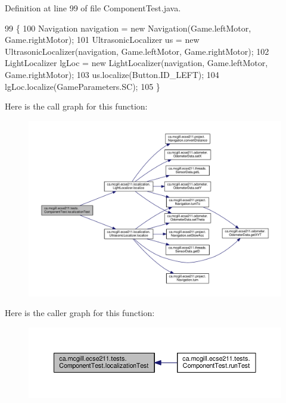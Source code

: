 Definition at line 99 of file Component\+Test.\+java.


\begin{DoxyCode}
99                                                                   \{
100     Navigation navigation = \textcolor{keyword}{new} Navigation(Game.leftMotor, Game.rightMotor);
101     UltrasonicLocalizer us = \textcolor{keyword}{new} UltrasonicLocalizer(navigation, Game.leftMotor, Game.rightMotor);
102     LightLocalizer lgLoc = \textcolor{keyword}{new} LightLocalizer(navigation, Game.leftMotor, Game.rightMotor);
103     us.localize(Button.ID\_LEFT);
104     lgLoc.localize(GameParameters.SC);
105   \}
\end{DoxyCode}
Here is the call graph for this function\+:
\nopagebreak
\begin{figure}[H]
\begin{center}
\leavevmode
\includegraphics[width=350pt]{enumca_1_1mcgill_1_1ecse211_1_1tests_1_1_component_test_ad11712dd74c5c64e84cd71186a59a087_cgraph}
\end{center}
\end{figure}
Here is the caller graph for this function\+:
\nopagebreak
\begin{figure}[H]
\begin{center}
\leavevmode
\includegraphics[width=350pt]{enumca_1_1mcgill_1_1ecse211_1_1tests_1_1_component_test_ad11712dd74c5c64e84cd71186a59a087_icgraph}
\end{center}
\end{figure}
\mbox{\label{enumca_1_1mcgill_1_1ecse211_1_1tests_1_1_component_test_a743c9bb90a8c8bc3fcf3b4c591990e7f}} 
